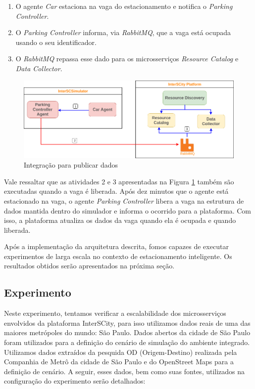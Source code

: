 \begin{enumerate}
    \item O agente \textit{Car} estaciona na vaga do estacionamento e notifica o \textit{Parking Controller}.

	\item O \textit{Parking Controller} informa, via \textit{RabbitMQ}, que a vaga está ocupada usando o seu identificador.

	\item O \textit{RabbitMQ} repassa esse dado para os microsserviços \textit{Resource Catalog} e \textit{Data Collector}.
\end{enumerate}

\begin{figure}[ht]
	\centering
	\includegraphics[width=\textwidth]{figuras/integration_publish_data_smart_parking.png}
	\caption{Integração para publicar dados}
	\label{fig:atualizacao}
\end{figure}

Vale ressaltar que as atividades 2 e 3 apresentadas na Figura \ref{fig:atualizacao} também são executadas quando a vaga é liberada.
Após dez minutos que o agente está estacionado na vaga, o agente \textit{Parking Controller} libera a vaga na estrutura de dados mantida dentro do simulador e informa o
ocorrido para a plataforma.
Com isso, a plataforma atualiza os dados da vaga quando ela é ocupada e quando liberada.

Após a implementação da arquitetura descrita, fomos capazes de executar experimentos de larga escala no contexto de estacionamento inteligente.
Os resultados obtidos serão apresentados na próxima seção.

\subsection{Experimento}
\label{sec:exp_smart_parking}

Neste experimento, tentamos verificar a escalabilidade dos microsserviços envolvidos da plataforma InterSCity, para isso utilizamos dados reais de uma das maiores metrópoles do mundo: São Paulo.
Dados abertos da cidade de São Paulo foram utilizados para a definição do cenário de simulação do ambiente integrado.
Utilizamos dados extraídos da pesquida OD (Origem-Destino) realizada pela Companhia de Metrô da cidade de São Paulo e do OpenStreet Maps para a definição de cenário.
A seguir, esses dados, bem como suas fontes, utilizados na configuração do experimento serão detalhados:

